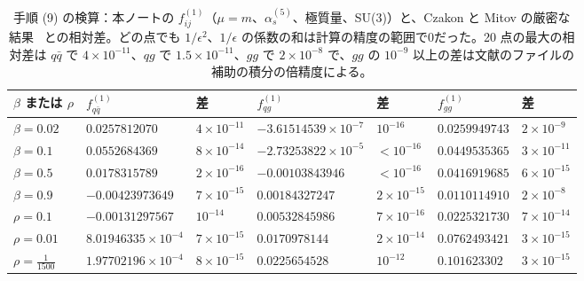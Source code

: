 \documentclass[a4paper,10pt]{ltjsarticle}
\begin{document}
\begin{table}[tbp]
\centering\small
\caption{手順 (9) の検算：本ノートの $f^{(1)}_{ij}$（$\mu=m$、$\alpha_s^{(5)}$、極質量、SU(3)）と、Czakon と Mitov の厳密な結果~\cite{cm10} との相対差。どの点でも $1/\epsilon^2$、$1/\epsilon$ の係数の和は計算の精度の範囲で0だった。20 点の最大の相対差は $q\bar q$ で $4\times10^{-11}$、$qg$ で $1.5\times10^{-11}$、$gg$ で $2\times10^{-8}$ で、$gg$ の $10^{-9}$ 以上の差は文献のファイルの補助の積分の倍精度による。}
\label{tab:hq}
\begin{tabular}{lllllll}
\toprule
$\beta$ または $\rho$ & $f^{(1)}_{q\bar q}$ & 差 & $f^{(1)}_{qg}$ & 差 & $f^{(1)}_{gg}$ & 差 \\
\midrule
$\beta=0.02$ & $0.0257812070$ & $4\times10^{-11}$ & $-3.61514539\times10^{-7}$ & $10^{-16}$ & $0.0259949743$ & $2\times10^{-9}$ \\
$\beta=0.1$ & $0.0552684369$ & $8\times10^{-14}$ & $-2.73253822\times10^{-5}$ & $<10^{-16}$ & $0.0449535365$ & $3\times10^{-11}$ \\
$\beta=0.5$ & $0.0178315789$ & $2\times10^{-16}$ & $-0.00103843946$ & $<10^{-16}$ & $0.0416919685$ & $6\times10^{-15}$ \\
$\beta=0.9$ & $-0.00423973649$ & $7\times10^{-15}$ & $0.00184327247$ & $2\times10^{-15}$ & $0.0110114910$ & $2\times10^{-8}$ \\
$\rho=0.1$ & $-0.00131297567$ & $10^{-14}$ & $0.00532845986$ & $7\times10^{-16}$ & $0.0225321730$ & $7\times10^{-14}$ \\
$\rho=0.01$ & $8.01946335\times10^{-4}$ & $7\times10^{-15}$ & $0.0170978144$ & $2\times10^{-14}$ & $0.0762493421$ & $3\times10^{-15}$ \\
$\rho=\frac1{1500}$ & $1.97702196\times10^{-4}$ & $8\times10^{-15}$ & $0.0225654528$ & $10^{-12}$ & $0.101623302$ & $3\times10^{-15}$ \\
\bottomrule
\end{tabular}
\end{table}
\end{document}
